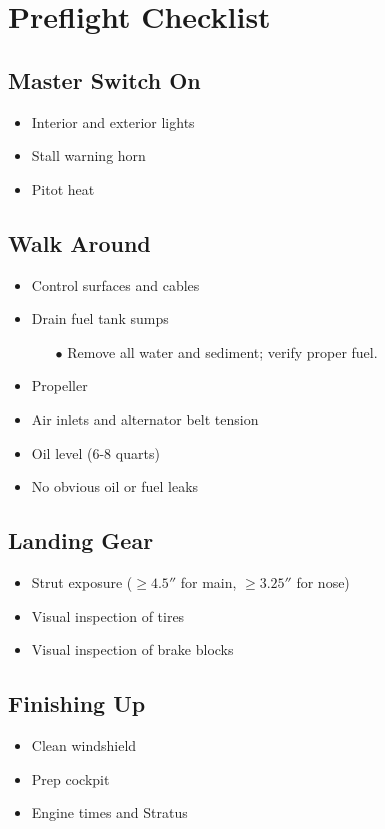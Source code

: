 \def\todoitem#1{
    \item[$\square$] #1 \dotfill
}

\section{Preflight Checklist}

\subsection{Master Switch On}

\begin{itemize}
    \todoitem{Interior and exterior lights}
    \todoitem{Stall warning horn}
    \todoitem{Pitot heat}
\end{itemize}

\subsection{Walk Around}

\begin{itemize}
    \todoitem{Control surfaces and cables}
    \todoitem{Drain fuel tank sumps}
    \begin{itemize}
        \item[$\bullet$] Remove all water and sediment; verify proper fuel.
    \end{itemize}
    \todoitem{Propeller}
    \todoitem{Air inlets and alternator belt tension}
    \todoitem{Oil level (6-8 quarts)}
    \todoitem{No obvious oil or fuel leaks}
\end{itemize}

\subsection{Landing Gear}

\begin{itemize}
    \todoitem{Strut exposure ($\geq 4.5''$ for main, $\geq 3.25''$ for nose)}
    \todoitem{Visual inspection of tires}
    \todoitem{Visual inspection of brake blocks}
\end{itemize}

\subsection{Finishing Up}

\begin{itemize}
    \todoitem{Clean windshield}
    \todoitem{Prep cockpit}
    \todoitem{Engine times and Stratus}
\end{itemize}
